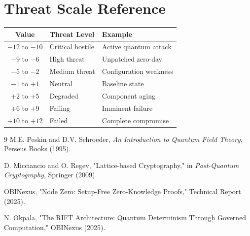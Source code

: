 \documentclass[11pt,a4paper]{article}
\begin{document}
\section{Threat Scale Reference}

\begin{center}
\begin{tabular}{c|l|l}
\hline
\textbf{Value} & \textbf{Threat Level} & \textbf{Example} \\
\hline
$-12$ to $-10$ & Critical hostile & Active quantum attack \\
$-9$ to $-6$ & High threat & Unpatched zero-day \\
$-5$ to $-2$ & Medium threat & Configuration weakness \\
$-1$ to $+1$ & Neutral & Baseline state \\
$+2$ to $+5$ & Degraded & Component aging \\
$+6$ to $+9$ & Failing & Imminent failure \\
$+10$ to $+12$ & Failed & Complete compromise \\
\hline
\end{tabular}
\end{center}

\begin{thebibliography}{9}
 M.E. Peskin and D.V. Schroeder, \textit{An Introduction to Quantum Field Theory}, Perseus Books (1995).

 D. Micciancio and O. Regev, "Lattice-based Cryptography," in \textit{Post-Quantum Cryptography}, Springer (2009).

 OBINexus, "Node Zero: Setup-Free Zero-Knowledge Proofs," Technical Report (2025).

 N. Okpala, "The RIFT Architecture: Quantum Determinism Through Governed Computation," OBINexus (2025).
\end{thebibliography}
\end{document}
